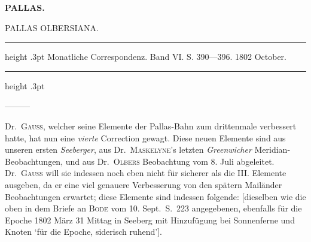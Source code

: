 \clearpage
\thispagestyle{empty}
\noindent{}%
%
\parbox[t]{\dimexpr\linewidth-24mm\relax}{\centering\footnotesize\bfseries PALLAS.\par}%
\makebox[12mm][r]{}\par\nobreak\medskip
{}
\begin{center}\large PALLAS OLBERSIANA.\end{center}
\begin{center}\parbox{.86\linewidth}{\centering\footnotesize\frenchspacing
\hrule height .3pt\relax\vspace{2.5pt}
Monatliche Correspondenz. Band VI. S. 390—396. 1802 October.\par
\vspace{2.5pt}\hrule height .3pt\relax
}\end{center}
\par\indent ---\enspace---\enspace---\par\nobreak

Dr.\ \textsc{Gauss}, welcher seine Elemente der Pallas-Bahn zum drittenmale verbessert hatte, hat nun eine \textit{vierte} Correction gewagt. Diese neuen Elemente sind aus unseren ersten \textit{Seeberger}, aus Dr.\ \textsc{Maskelyne}'s letzten \textit{Greenwicher} Meridian-Beobachtungen, und aus Dr.\ \textsc{Olbers} Beobachtung vom 8. Juli abgeleitet. Dr.\ \textsc{Gauss} will sie indessen noch eben nicht für sicherer als die III. Elemente ausgeben, da er eine viel genauere Verbesserung von den spätern Mailänder Beobachtungen erwartet; diese Elemente sind indessen folgende: [dieselben wie die oben in dem Briefe an \textsc{Bode} vom 10. Sept.\ S.\ 223 angegebenen, ebenfalls für die Epoche 1802 März 31 Mittag in Seeberg mit Hinzufügung bei Sonnenferne und Knoten ‘für die Epoche, siderisch ruhend’].

